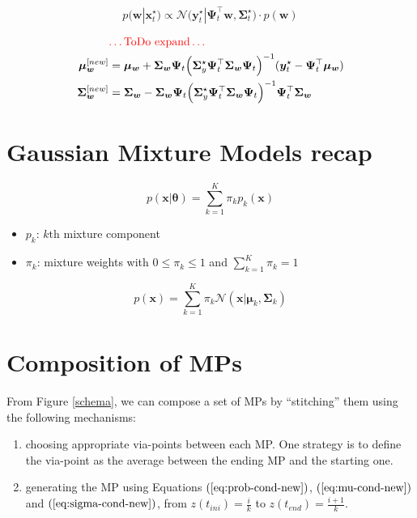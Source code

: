 \documentclass[11pt, letterpaper]{article}
\begin{document}
\begin{equation}
p(\bm{w}|\bm{x}_t^\star) \propto \mathcal{N}\Big( \bm{y}_t^\star | \bm{\Psi}_t^\top\bm{w}, \bm{\Sigma}^\star_t \Big) \cdot p(\bm{w})\label{eq:prob-cond-new}
\end{equation}

\begin{align}
& \textcolor{red}{\dots\text{ToDo expand}\dots}\\
\bm{\mu_w}^{[new]} &= \bm{\mu_w} + \bm{\Sigma_w}\bm{\Psi}_t \Big(\bm{\Sigma}_y^\star \bm{\Psi}_t^\top \bm{\Sigma_w}\bm{\Psi}_t \Big)^{-1} (\bm{y}_t^\star - \bm{\Psi}_t^\top \bm{\mu_w})\label{eq:mu-cond-new}\\
\bm{\Sigma_w}^{[new]} &= \bm{\Sigma_w} - \bm{\Sigma_w}\bm{\Psi}_t \Big(\bm{\Sigma}_y^\star \bm{\Psi}_t^\top \bm{\Sigma_w}\bm{\Psi}_t \Big)^{-1} \bm{\Psi}_t^\top \bm{\Sigma_w}\label{eq:sigma-cond-new}
\end{align}
\section{Gaussian Mixture Models recap}
\label{sec:org0cc01ae}
\begin{equation}
p(\bm{x}|\bm{\theta}) = \sum_{k=1}^K \pi_k p_k(\bm{x})
\end{equation}
\begin{itemize}
\item \(p_k\): \(k\text{th}\) mixture component
\item \(\pi_k\): mixture weights with \(0 \leq \pi_k \leq 1\) and \(\sum_{k=1}^K \pi_k = 1\)
\end{itemize}

\begin{equation}
p(\bm{x}) = \sum_{k=1}^K \pi_k \mathcal{N}(\bm{x}|\bm{\mu}_k, \bm{\Sigma}_k)
\end{equation}
\section{Composition of MPs}
\label{sec:orgecf2f7f}

From Figure \ref{schema}, we can compose a set of MPs by ``stitching'' them using the following mechanisms:
\begin{enumerate}
\item choosing appropriate via-points between each MP. One strategy is to define the via-point as the average between the ending MP and the starting one.
\item generating the MP using Equations \((\ref{eq:prob-cond-new})\), \((\ref{eq:mu-cond-new})\) and \((\ref{eq:sigma-cond-new})\), from \(z(t_{ini}) = \frac{i}{k}\) to \(z(t_{end}) = \frac{i+1}{k}\).
\end{enumerate}
\end{document}
